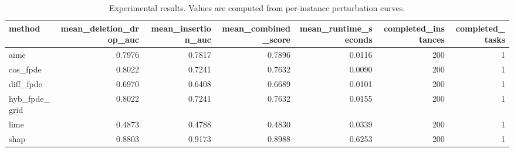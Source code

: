 \begin{table}[t]
\caption{Experimental results. Values are computed from per-instance perturbation curves.}
\label{tab:main_results_computed}
\centering
\begin{tabular}{lrrrrrr}
\toprule
method & mean\_deletion\_drop\_auc & mean\_insertion\_auc & mean\_combined\_score & mean\_runtime\_seconds & completed\_instances & completed\_tasks \\
\midrule
aime & 0.7976 & 0.7817 & 0.7896 & 0.0116 & 200 & 1 \\
cos\_fpde & 0.8022 & 0.7241 & 0.7632 & 0.0090 & 200 & 1 \\
diff\_fpde & 0.6970 & 0.6408 & 0.6689 & 0.0101 & 200 & 1 \\
hyb\_fpde\_grid & 0.8022 & 0.7241 & 0.7632 & 0.0155 & 200 & 1 \\
lime & 0.4873 & 0.4788 & 0.4830 & 0.0339 & 200 & 1 \\
shap & 0.8803 & 0.9173 & 0.8988 & 0.6253 & 200 & 1 \\
\bottomrule
\end{tabular}

\end{table}
